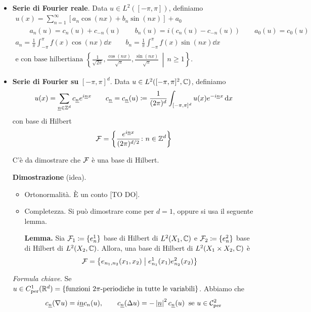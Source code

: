 \begin{itemize}

	\item \textbf{Serie di Fourier reale}. Data $u \in L^2([-\pi,\pi])$, definiamo
	$$
	\begin{gathered}
		u(x) = \sum_{n=1}^\infty \left[ a_n \cos(nx) + b_n \sin(nx) \right] + a_0 \\
		\qquad
		a_n(u) = c_n(u) + c_{-n}(u)
		\qquad
		b_n(u) = i(c_n(u) - c_{-n}(u))
		\qquad
		a_0(u) = c_0(u) \\
		a_n = \frac{1}{\pi} \int_{-\pi}^\pi f(x) \cos(nx) \dd x
		\qquad
		b_n = \frac{1}{\pi} \int_{-\pi}^\pi f(x) \sin(nx) \dd x \\
		\text{e con base hilbertiana } \left\{ \frac{1}{\sqrt{2\pi}}, \frac{\cos(nx)}{\sqrt{\pi}}, \frac{\sin(nx)}{\sqrt{\pi}} \,\middle|\, n \geq 1 \right\}.
	\end{gathered}
	$$

	\item \textbf{Serie di Fourier su} \boldmath$[-\pi,\pi]^d$. Data \unboldmath$u \in L^2([-\pi,\pi]^2, \mathbb C)$, definiamo
	$$
		u(x) = \sum_{\underline{n} \in \mathbb Z^d} c_{\underline{n}} e^{i \underline{n} x} \qquad 
		c_{\underline{n}} = c_{\underline{n}} (u) \coloneqq \frac{1}{(2\pi)^d} \int_{[-\pi,\pi]^d} u(x) e^{- i \underline{n} x} \,\mathrm{d} x 
	$$
	con base di Hilbert
	$$
		\mathcal{F} = \left\{ \frac{e^{i \underline{n} x}}{(2\pi)^{d/2}} \colon n \in \mathbb Z^d \right\}
	$$

	C'è da dimostrare che $\mathcal{F}$ è una base di Hilbert.

	\textbf{Dimostrazione} (idea). 
	\begin{itemize}

		\item Ortonormalità. È un conto [TO DO].


		\item Completezza. Si può dimostrare come per $d = 1$, oppure si usa il seguente lemma.

		\textbf{Lemma.} Sia $\mathcal{F}_1 \coloneqq \{ e_n^1 \}$ base di Hilbert di $L^2(X_1, \mathbb C)$ e $\mathcal{F}_2 \coloneqq \{ e_n^2 \}$ base di Hilbert di $L^2(X_2, \mathbb C)$. Allora, una base di Hilbert di $L^2(X_1 \times X_2, \mathbb C)$ è
		$$
			\mathcal{F} = \left\{ e_{n_1,n_2}(x_1,x_2) \;\middle|\; e_{n_1}^1 (x_1) e_{n_2}^2(x_2) \right\}
		$$

	\end{itemize}

	\textit{Formula chiave.}
	Se $u \in C_{\text{per}}^1 (\mathbb R^d) = \left\{ \text{funzioni $2\pi$-periodiche in tutte le variabili} \right\}$. Abbiamo che
	$$
		c_{\underline{n}} (\nabla u) = i \underline{n} c_n(u), \qquad 
		c_{\underline{n}} (\Delta u) = - \left| \underline{n} \right|^2 c_{\underline{n}} (u) \;\; \text{se }  u \in \mathcal{C}_{\text{per}}^2
	$$



\end{itemize}
